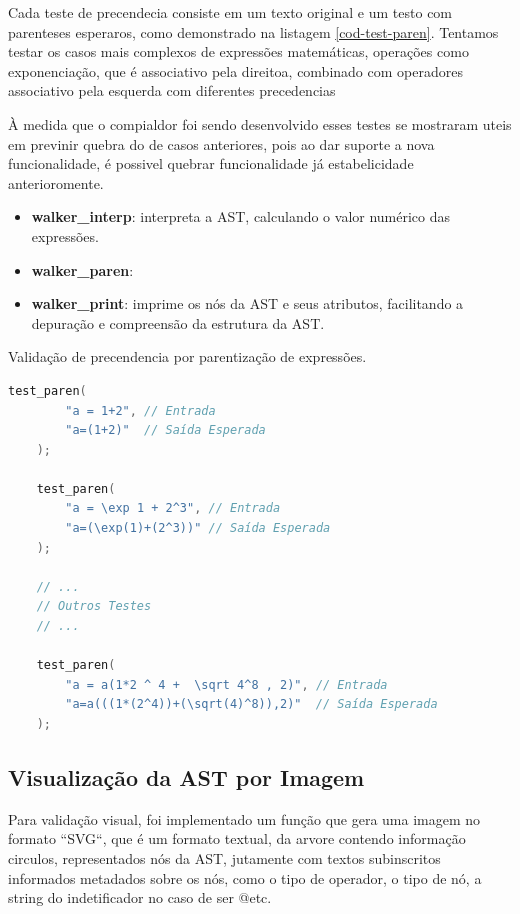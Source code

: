 Cada teste de precendecia consiste em um texto original e um testo com parenteses esperaros, como demonstrado na listagem \autoref{cod-test-paren}. Tentamos testar os casos mais complexos de expressões matemáticas, operações como exponenciação, que é associativo pela direitoa, combinado com operadores associativo pela esquerda  com diferentes precedencias

À medida que o compialdor foi sendo desenvolvido esses testes se mostraram uteis em previnir quebra do de casos anteriores, pois ao dar suporte a nova funcionalidade, é possivel quebrar funcionalidade já estabelicidade anterioromente.

\begin{itemize}
  \item \textbf{walker\_interp}: interpreta a AST, calculando o valor numérico das expressões.
  \item \textbf{walker\_paren}:   \item \textbf{walker\_print}: imprime os nós da AST e seus atributos, facilitando a depuração e compreensão da estrutura da AST.
\end{itemize}

\begin{codigo}[htb]
    \caption{\small Validação de precendencia por parentização de expressões. }
        \label{cod-test-paren}
  \begin{lstlisting}[language = C]
    test_paren(
        "a = 1+2", // Entrada
        "a=(1+2)"  // Saída Esperada
    );

    test_paren(
        "a = \exp 1 + 2^3", // Entrada
        "a=(\exp(1)+(2^3))" // Saída Esperada
    );

    // ...
    // Outros Testes
    // ...

    test_paren(
        "a = a(1*2 ^ 4 +  \sqrt 4^8 , 2)", // Entrada
        "a=a(((1*(2^4))+(\sqrt(4)^8)),2)"  // Saída Esperada
    );
  \end{lstlisting}
\end{codigo}



\subsection{Visualização da AST por Imagem}

Para validação visual, foi implementado um função que gera uma imagem no formato ``SVG``, que é um formato textual, da arvore contendo informação circulos, representados nós da AST, jutamente com textos subinscritos informados metadados sobre os nós, como o tipo de operador, o tipo de nó, a string do indetificador  no caso de ser @etc.

